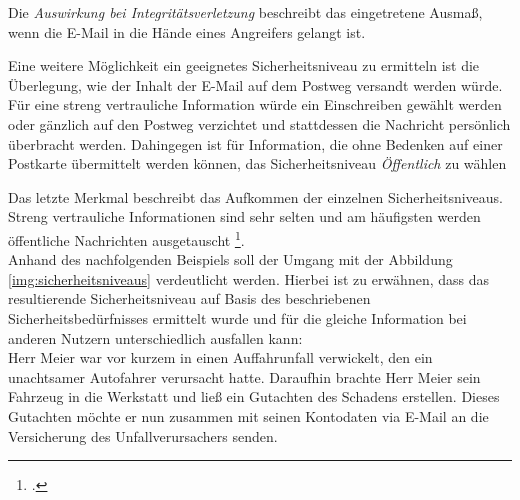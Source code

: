 \documentclass  [paper=a4,
				fontsize=12pt,
				listof=totoc,
				bibliography=totoc
				]{scrreprt}
\begin{document}
		
		Die \textit{Auswirkung bei Integritätsverletzung} beschreibt das eingetretene Ausmaß, wenn die E-Mail in die Hände eines Angreifers gelangt ist.
		
		
		Eine weitere Möglichkeit ein geeignetes Sicherheitsniveau zu ermitteln ist die Überlegung, wie der Inhalt der E-Mail auf dem Postweg versandt werden würde. Für eine streng vertrauliche Information würde ein Einschreiben gewählt werden oder gänzlich auf den Postweg verzichtet und stattdessen die Nachricht persönlich überbracht werden. Dahingegen ist für Information, die ohne Bedenken  auf einer Postkarte übermittelt werden können, das Sicherheitsniveau \textit{Öffentlich} zu wählen 
		
		
		Das letzte Merkmal beschreibt das Aufkommen der einzelnen Sicherheitsniveaus. Streng vertrauliche Informationen sind sehr selten und am häufigsten werden öffentliche Nachrichten ausgetauscht \footcite[Vgl.][]{TSE}.
		\medskip\\
	
		Anhand des nachfolgenden Beispiels soll der Umgang mit der Abbildung \ref{img:sicherheitsniveaus} verdeutlicht werden. Hierbei ist zu erwähnen, dass das resultierende Sicherheitsniveau auf Basis des beschriebenen Sicherheitsbedürfnisses ermittelt wurde und für die gleiche Information bei anderen Nutzern unterschiedlich ausfallen kann:
		\medskip\\
		
		Herr Meier war vor kurzem in einen Auffahrunfall verwickelt, den ein unachtsamer Autofahrer verursacht hatte. Daraufhin brachte Herr Meier sein Fahrzeug in die Werkstatt und ließ ein Gutachten des Schadens erstellen. Dieses Gutachten möchte er nun zusammen mit seinen Kontodaten via E-Mail an die Versicherung des Unfallverursachers senden. 
		
\end{document}
